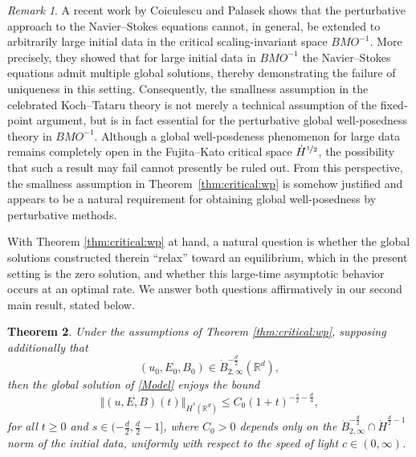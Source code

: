 \documentclass[11pt, leqno, a4paper,]{amsart}
\newtheorem{theorem}{Theorem}[section]
\theoremstyle{remark}
\newtheorem{remark}[theorem]{Remark}
\numberwithin{equation}{section}
\newcommand*{\norm}[1]{\left\Vert #1\right\Vert}
\begin{document}
\begin{remark}
A recent work by Coiculescu and Palasek \cite{Coiculescu:2026aa} shows that the perturbative approach to the Navier--Stokes equations cannot, in general, be extended to arbitrarily large initial data in the critical scaling-invariant space $BMO^{-1}$. More precisely, they showed that for large initial data in $BMO^{-1}$  the Navier--Stokes equations admit multiple global solutions, thereby demonstrating the failure of uniqueness in this setting. Consequently, the smallness assumption in the celebrated Koch--Tataru theory \cite{KT01}   is not merely a technical assumption of the fixed-point argument, but is in fact essential for the perturbative global well-posedness theory in $BMO^{-1}$.
 Although a global well-posdeness phenomenon for large data  remains completely open in the Fujita--Kato critical space $\dot{H}^{\nicefrac{1}{2}}$, the possibility that such a result may fail cannot presently be ruled out. From this perspective, the smallness assumption in Theorem~\ref{thm:critical:wp} is somehow justified and appears to be a natural requirement for obtaining global well-posedness by perturbative methods.
\end{remark}  

With Theorem \ref{thm:critical:wp} at hand, a natural question is whether the global solutions constructed therein ``relax'' toward an equilibrium, which in the present setting is the zero solution, and whether this large-time asymptotic behavior occurs at an optimal rate. We answer both questions affirmatively in our second main result, stated below.
   \begin{theorem}\label{thm:decay}
   	Under the assumptions of Theorem \ref{thm:critical:wp}, supposing additionally that 
   	\begin{equation*}
   		(u_0,E_0,B_0)\in \dot B^{-\frac{d}{2}}_{2,\infty}(\mathbb R^d),
   	\end{equation*}
   	then the global solution of \eqref{Model} enjoys the bound
   	\begin{equation*}
   		\norm {(u,E,B)(t)}_{\dot H^s (\mathbb R^d)}  \leq C_0 (1+t)^{-\frac{s}{2} -\frac{d}{4}},
   	\end{equation*}
   	for all $t\geq 0$ and  $s\in (-\frac{d}{2},\frac{d}{2}-1]$, where $C_0>0$ depends only on the $\dot B^{-\frac{d}{2}}_{2,\infty} \cap \dot H^{\frac{d}{2}-1}$ norm of the initial data, uniformly with respect to the speed of light $c\in (0,\infty)$. 
   \end{theorem}  
   
\end{document}
